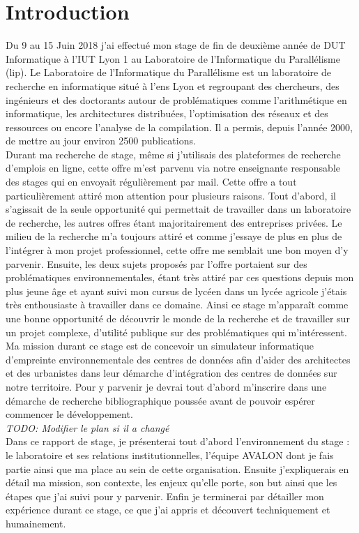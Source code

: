 \newpage
\section*{Introduction}

Du 9 au 15 Juin 2018 j'ai effectué mon stage de fin de deuxième année de DUT Informatique à l'IUT Lyon 1 au Laboratoire de l'Informatique du Parallélisme (\gls{lip}).
Le Laboratoire de l'Informatique du Parallélisme est un laboratoire de recherche en informatique situé à l'\gls{ens} Lyon et regroupant des chercheurs, des ingénieurs et des doctorants autour de problématiques comme l'arithmétique en informatique, les architectures distribuées, l'optimisation des réseaux et des ressources ou encore l'analyse de la compilation. Il a permis, depuis l'année 2000, de mettre au jour environ 2500 publications.\\

Durant ma recherche de stage, même si j'utilisais des plateformes de recherche d'emplois en ligne, cette offre m'est parvenu via notre enseignante responsable des stages qui en envoyait régulièrement par mail. Cette offre a tout particulièrement attiré mon attention pour plusieurs raisons. Tout d'abord, il s'agissait de la seule opportunité qui permettait de travailler dans un laboratoire de recherche, les autres offres étant majoritairement des entreprises privées. Le milieu de la recherche m'a toujours attiré et comme j'essaye de plus en plus de l'intégrer à mon projet professionnel, cette offre me semblait une bon moyen d'y parvenir. Ensuite, les deux sujets proposés par l'offre portaient sur des problématiques environnementales, étant très attiré par ces questions depuis mon plus jeune âge et ayant suivi mon cursus de lycéen dans un lycée agricole j'étais très enthousiaste à travailler dans ce domaine. Ainsi ce stage m'apparaît comme une bonne opportunité de découvrir le monde de la recherche et de travailler sur un projet complexe, d'utilité publique sur des problématiques qui m'intéressent.\\

Ma mission durant ce stage est de concevoir un simulateur informatique d'empreinte environnementale des centres de données afin d'aider des architectes et des urbanistes dans leur démarche d'intégration des centres de données sur notre territoire. Pour y parvenir je devrai tout d'abord m'inscrire dans une démarche de recherche bibliographique poussée avant de pouvoir espérer commencer le développement.\\

\emph{TODO: Modifier le plan si il a changé}\\
Dans ce rapport de stage, je présenterai tout d'abord l'environnement du stage : le laboratoire et ses relations institutionnelles, l'équipe AVALON dont je fais partie ainsi que ma place au sein de cette organisation. Ensuite j'expliquerais en détail ma mission, son contexte, les enjeux qu'elle porte, son but ainsi que les étapes que j'ai suivi pour y parvenir. Enfin je terminerai par détailler mon expérience durant ce stage, ce que j'ai appris et découvert techniquement et humainement.